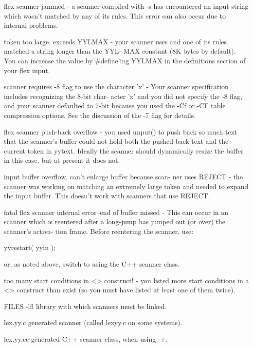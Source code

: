 \documentclass[12pt,spanish,twocolumn,lettersize]{article}
\begin{document}
{       flex  scanner  jammed  -	 a  scanner  compiled with -s has
       encountered an input string which wasn't matched by any of
       its  rules.   This  error  can  also occur due to internal
       problems.

       token too large, exceeds YYLMAX - your scanner uses %
       and one of its rules matched a string longer than the YYL-
       MAX constant (8K bytes by default).  You can increase  the
       value  by #define'ing YYLMAX in the definitions section of
       your flex input.

       scanner requires -8 flag to use the character 'x'  -  Your
       scanner specification includes recognizing the 8-bit char-
       acter 'x' and you did not specify the -8	 flag,	and  your
       scanner defaulted to 7-bit because you used the -Cf or -CF
       table compression options.  See the discussion of  the  -7
       flag for details.

       flex scanner push-back overflow - you used unput() to push
       back so much text that the scanner's buffer could not hold
       both the pushed-back text and the current token in yytext.
       Ideally the scanner should dynamically resize  the  buffer
       in this case, but at present it does not.

       input  buffer overflow, can't enlarge buffer because scan-
       ner uses REJECT - the scanner was working on  matching  an
       extremely  large	 token	and  needed  to	 expand the input
       buffer.	This doesn't work with scanners that use  REJECT.

       fatal  flex scanner internal error--end of buffer missed -
       This can occur in an scanner which is  reentered	 after	a
       long-jump  has  jumped out (or over) the scanner's activa-
       tion frame.  Before reentering the scanner, use:

	   yyrestart( yyin );

       or, as noted above, switch to using the C++ scanner class.

       too  many  start	 conditions in <> construct! - you listed
       more start conditions in a <> construct than exist (so you
       must have listed at least one of them twice).

FILES
       -lfl   library with which scanners must be linked.

       lex.yy.c
	      generated scanner (called lexyy.c on some systems).

       lex.yy.cc
	      generated C++ scanner class, when using -+.

}
\end{document}
